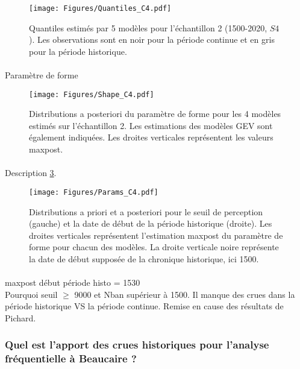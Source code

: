 \documentclass[11pt]{article}
\begin{document}
	\begin{figure}[h]
		\centering
		\texttt{[image: Figures/Quantiles\_C4.pdf]}
		\caption{Quantiles estimés par 5 modèles pour l'échantillon 2 (1500-2020, $S4$). Les observations sont en noir pour la période continue et en gris pour la période historique.}
		\label{fig:QuantilesC4}
	\end{figure}
	
	\paragraph{}Paramètre de forme
	
\begin{figure}[h]
		\centering
		\texttt{[image: Figures/Shape\_C4.pdf]}	
		\caption{Distributions a posteriori du paramètre de forme pour les 4 modèles estimés sur l'échantillon 2. Les estimations des modèles GEV sont également indiquées. Les droites verticales représentent les valeurs maxpost.}
		\label{fig:Shape_C4}
	\end{figure}
	
	\paragraph{} Description \ref{fig:Params_C4}.
	
	
	\begin{figure}[h]
		\centering
		\texttt{[image: Figures/Params\_C4.pdf]}	
		\caption{Distributions a priori et a posteriori pour le seuil de perception (gauche) et la date de début de la période historique (droite). Les droites verticales représentent l'estimation maxpost du paramètre de forme pour chacun des modèles. La droite verticale noire représente la date de début supposée de la chronique historique, ici 1500.}
		\label{fig:Params_C4}
	\end{figure}
	
	\paragraph{} maxpost début période histo = 1530\\
	Pourquoi seuil $\geq$ 9000 et Nban supérieur à 1500. 
	Il manque des crues dans la période historique VS la période continue. Remise en cause des résultats de Pichard. 
	
		\subsubsection{Quel est l'apport des crues historiques pour l'analyse fréquentielle à Beaucaire ?}
\end{document}
